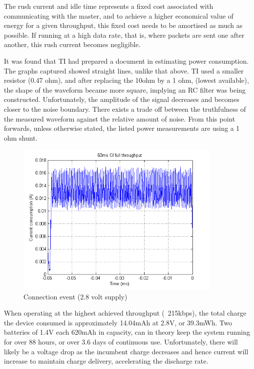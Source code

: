 \documentclass[]{article}
\begin{document}
 The rush current and idle time represents a fixed cost associated with communicating with the master, and to achieve a higher economical value of energy for a given throughput, this fixed cost needs to be amortised as much as possible. If running at a high data rate, that is, where packets are sent one after another, this rush current becomes negligible.  

It was found that \ac{TI} had prepared a document \cite{bleti} in estimating power consumption. The graphs captured showed straight lines, unlike that above. \ac{TI} used a smaller resistor (0.47 ohm), and after replacing the 10ohm by a 1 ohm, (lowest available), the shape of the waveform became more square, implying an RC filter was being constructed. Unfortunately, the amplitude of the signal decreases and becomes closer to the noise boundary. There exists a trade off between the truthfulness of the measured waveform against the relative amount of noise. From this point forwards, unless otherwise stated, the listed power measurements are using a 1 ohm shunt.

\begin{figure}[H]
	\begin{center}
		\includegraphics[width = 0.9\textwidth]{60msci}
	\end{center}
	\caption{Connection event (2.8 volt supply)}
	\label{fig:60msci}
\end{figure}

When operating at the highest achieved throughput (~215kbps), the total charge the device consumed is approximately 14.04mAh at 2.8V, or 39.3mWh. Two batteries of 1.4V each 620mAh in capacity, can in theory keep the system running for over 88 hours, or over 3.6 days of continuous use. Unfortunately, there will likely be a voltage drop as the incumbent charge decreases and hence current will increase to maintain charge delivery, accelerating the discharge rate.
\end{document}
